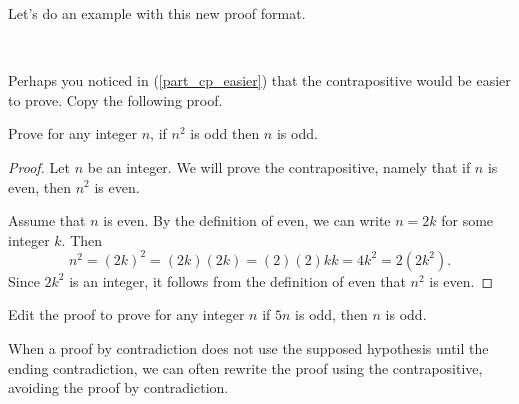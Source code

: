 Let's do an example with this new proof format.

\begin{act}
\label{act_direct_proof_ifnsqoddthennodd}
~
    \begin{actpart}
        \item \label{part_ifnsqoddthennodd} Perhaps you noticed in  (\ref{part_cp_easier}) that the contrapositive would be easier to prove.  Copy the following proof.

        Prove for any integer $n$, if $n^2$ is odd then $n$ is odd.
        \begin{proof}
            Let $n$ be an integer.  We will prove the contrapositive, namely that if $n$ is even, then $n^2$ is even.         
            
            Assume that $n$ is even.  By the definition of even, we can write $n=2k$ for some integer $k$.  Then $$n^2=(2k)^2=(2k)(2k) = (2)(2)kk = 4k^2 = 2(2k^2).$$
            Since $2k^2$ is an integer, it follows from the definition of even that $n^2$ is even.
        \end{proof}
        \item Edit the proof to prove for any integer $n$ if $5n$ is odd, then $n$ is odd.  
    \end{actpart}
\end{act}

When a proof by contradiction does not use the supposed hypothesis until the ending contradiction, we can often rewrite the proof using the contrapositive, avoiding the proof by contradiction.

